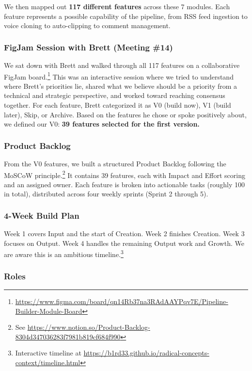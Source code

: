\documentclass[11pt,a4paper]{article}
\begin{document}
We then mapped out \textbf{117 different features} across these 7 modules. Each feature represents a possible capability of the pipeline, from RSS feed ingestion to voice cloning to auto-clipping to comment management.

\subsubsection{FigJam Session with Brett (Meeting \#14)}

We sat down with Brett and walked through all 117 features on a collaborative FigJam board.\footnote{\url{https://www.figma.com/board/qn14Rb37na3RAdAAYPqv7E/Pipeline-Builder-Module-Board}} This was an interactive session where we tried to understand where Brett's priorities lie, shared what we believe should be a priority from a technical and strategic perspective, and worked toward reaching consensus together. For each feature, Brett categorized it as V0 (build now), V1 (build later), Skip, or Archive. Based on the features he chose or spoke positively about, we defined our V0: \textbf{39 features selected for the first version.}

\subsubsection{Product Backlog}

From the V0 features, we built a structured Product Backlog following the MoSCoW principle.\footnote{See \url{https://www.notion.so/Product-Backlog-8304d347036283f7981b819cf684f990}} It contains 39 features, each with Impact and Effort scoring and an assigned owner. Each feature is broken into actionable tasks (roughly 100 in total), distributed across four weekly sprints (Sprint 2 through 5).

\subsubsection{4-Week Build Plan}

Week 1 covers Input and the start of Creation. Week 2 finishes Creation. Week 3 focuses on Output. Week 4 handles the remaining Output work and Growth. We are aware this is an ambitious timeline.\footnote{Interactive timeline at \url{https://b1rd33.github.io/radical-concepts-context/timeline.html}}

\subsubsection{Roles}
\end{document}
